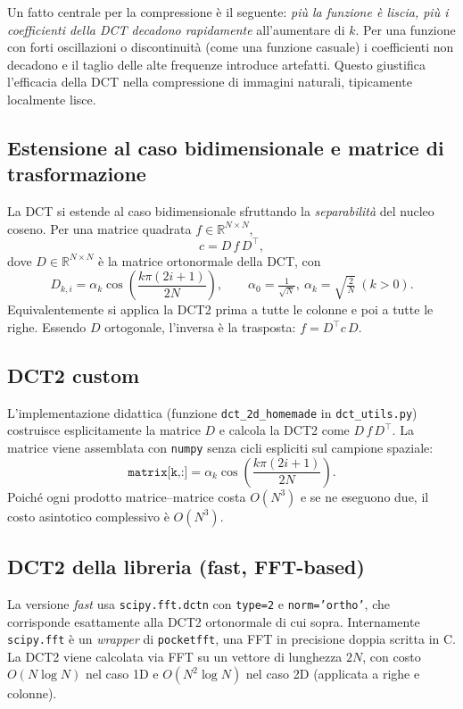 \documentclass[11pt,a4paper]{article}
\begin{document}
Un fatto centrale per la compressione è il seguente: \emph{più la funzione è
liscia, più i coefficienti della DCT decadono rapidamente} all'aumentare di
$k$. Per una funzione con forti oscillazioni o discontinuità (come una
funzione casuale) i coefficienti non decadono e il taglio delle alte frequenze
introduce artefatti. Questo giustifica l'efficacia della DCT nella compressione
di immagini naturali, tipicamente localmente lisce.

\subsection{Estensione al caso bidimensionale e matrice di trasformazione}

La DCT si estende al caso bidimensionale sfruttando la \emph{separabilità} del
nucleo coseno. Per una matrice quadrata $f\in\mathbb{R}^{N\times N}$,
\[
c = D\, f\, D^\top,
\]
dove $D\in\mathbb{R}^{N\times N}$ è la matrice ortonormale della DCT, con
\[
D_{k,i} = \alpha_k \cos\!\left(\frac{k\pi(2i+1)}{2N}\right), \qquad
\alpha_0 = \tfrac{1}{\sqrt{N}},\ \alpha_k = \sqrt{\tfrac{2}{N}}\ (k>0).
\]
Equivalentemente si applica la DCT2 prima a tutte le colonne e poi a tutte le
righe. Essendo $D$ ortogonale, l'inversa è la trasposta:
$f = D^\top c\, D$.

\subsection{DCT2 \guillemotleft custom\guillemotright}\label{sec:custom}

L'implementazione didattica (funzione \texttt{dct\_2d\_homemade} in
\texttt{dct\_utils.py}) costruisce esplicitamente la matrice $D$ e calcola la
DCT2 come $D\, f\, D^\top$. La matrice viene assemblata con
\texttt{numpy} senza cicli espliciti sul campione spaziale:
\[
\texttt{matrix[k,:]} = \alpha_k \cos\!\left(\frac{k\pi(2i+1)}{2N}\right).
\]
Poiché ogni prodotto matrice--matrice costa $O(N^3)$ e se ne eseguono due, il
costo asintotico complessivo è $O(N^3)$.

\subsection{DCT2 della libreria (fast, FFT-based)}\label{sec:fast}

La versione \emph{fast} usa \texttt{scipy.fft.dctn} con \texttt{type=2} e
\texttt{norm='ortho'}, che corrisponde esattamente alla DCT2 ortonormale di
cui sopra. Internamente \texttt{scipy.fft} è un \emph{wrapper} di
\texttt{pocketfft}, una FFT in precisione doppia scritta in C. La DCT2 viene
calcolata via FFT su un vettore di lunghezza $2N$, con costo $O(N\log N)$ nel
caso 1D e $O(N^2\log N)$ nel caso 2D (applicata a righe e colonne).
\end{document}
